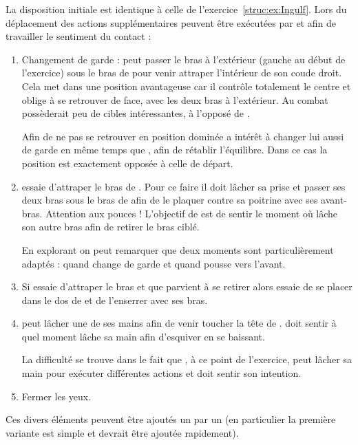 \begin{exercice}
\label{att:ex:Ingulf-variantes}


La disposition initiale est identique à celle de l'exercice~\ref{struc:ex:Ingulf}.
Lors du déplacement des actions supplémentaires peuvent être exécutées par \A et \D afin de travailler le sentiment du contact :
\begin{enumerate}
	\item Changement de garde : \A peut passer le bras à l'extérieur (gauche au début de l'exercice) sous le bras de \D pour venir attraper l'intérieur de son coude droit.
	Cela met \A dans une position avantageuse car il contrôle totalement le centre et oblige \D à se retrouver de face, avec les deux bras à l'extérieur.
	Au combat \D possèderait peu de cibles intéressantes, à l'opposé de \A.
	
	Afin de ne pas se retrouver en position dominée \D a intérêt à changer lui aussi de garde en même temps que \A, afin de rétablir l'équilibre.
	Dans ce cas la position est exactement opposée à celle de départ.
	
	\item \A essaie d'attraper le bras de \D.
	Pour ce faire il doit lâcher sa prise et passer ses deux bras sous le bras de \D afin de le plaquer contre sa poitrine avec ses avant-bras.
	Attention aux pouces !
	L'objectif de \D est de sentir le moment où \A lâche son autre bras afin de retirer le bras ciblé.
	
	En explorant on peut remarquer que deux moments sont particulièrement adaptés : quand \D change de garde et quand \D pousse vers l'avant.
	
	\item Si \A essaie d'attraper le bras et que \D parvient à se retirer alors \D essaie de se placer dans le dos de \A et de l'enserrer avec ses bras.
	
	\item \A peut lâcher une de ses mains afin de venir toucher la tête de \D.
	\D doit sentir à quel moment \A lâche sa main afin d'esquiver en se baissant.
	
	La difficulté se trouve dans le fait que \A, à ce point de l'exercice, \A peut lâcher sa main pour exécuter différentes actions et \D doit sentir son intention.
	
	\item Fermer les yeux.
\end{enumerate}
Ces divers éléments peuvent être ajoutés un par un (en particulier la première variante est simple et devrait être ajoutée rapidement).

\end{exercice}


